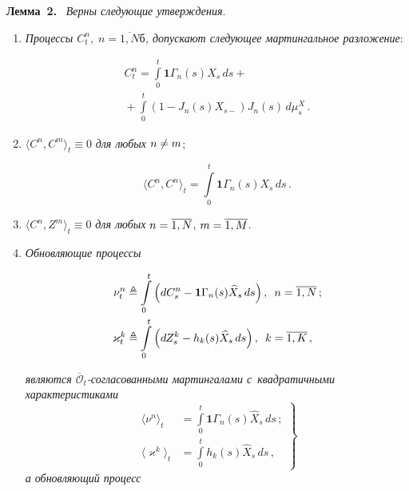 \begin{multicols}{2}

\noindent
\textbf{Лемма~2.}\
 \textit{Верны следующие утверждения}.
 \begin{enumerate}
 \item
  \textit{Процессы $C_t^n,\; n=\overline{1,N}б$, допускают следующее мартингальное разложение}:
  
    \vspace*{-3pt}
  
\noindent
 \begin{multline*}
 C_t^n = \int\limits_0^t \mathbf{1}\Gamma_n(s)X_{s}\,ds +{}\\
 {}+ \int\limits_0^t 
 \left(1 - J_n(s)X_{s-}\right)J_n(s)\,d\mu_s^X\,.
 \label{eq:Cj_dec}
 \end{multline*}
 \item
 $\langle C^n,C^m\rangle_t \equiv 0$  \textit{для любых} $n \hm\neq m$;
 
     \vspace*{-1pt}
     
     \noindent
 \begin{equation*}
 \langle C^n, C^n \rangle_t = \int\limits_0^t \mathbf{1}\Gamma_n(s)X_{s}\,ds\,.
 \end{equation*}
 \item
 $\langle C^n, Z^m \rangle_t \equiv 0$  \textit{для любых} $n\hm=\overline{1,N}$, $m\hm=\overline{1,M}$.
 \item
 \textit{Обновляющие процессы}
 
     \vspace*{-4pt}
     
     \noindent
 \begin{align*}
 \nu_t^n &\triangleq \int\limits_0^t \left(dC_s^n - \mathbf{1}\Gamma_n(s)\widehat{X}_{s}\,ds \right), 
 \enskip n=\overline{1,N}\,;
\\
 \varkappa_t^k &\triangleq \int\limits_0^t \left(dZ_s^k - h_k(s)\widehat{X}_{s}\,ds \right), \enskip 
 k=\overline{1,K}\,,
 \end{align*}
 
 \vspace*{-2pt}
 
 \noindent
  \textit{являются $\overline{\mathcal{O}}_t$-со\-гла\-со\-ван\-ны\-ми 
  мартингалами с~квадратичными характеристиками}
 \begin{equation}
 \left.
 \begin{array}{rl}
 \langle \nu^n\rangle_t&= \displaystyle\int\limits_0^t \mathbf{1}\Gamma_n(s)\widehat{X}_{s}\,ds\,; \\[6pt]
 \langle \varkappa^k \rangle_t&=\displaystyle \int\limits_0^t h_k(s)\widehat{X}_{s}\, ds\,,
 \end{array}
 \right\}
 \label{eq:nkij_char}
 \end{equation}
  \textit{а обновляющий процесс}
  

\end{enumerate}
\end{multicols}
